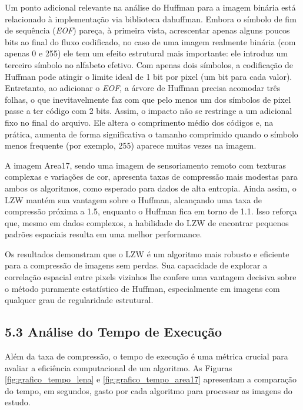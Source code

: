 \documentclass{report}
\begin{document}
Um ponto adicional relevante na análise do Huffman para a imagem binária está relacionado à implementação via biblioteca dahuffman. Embora o símbolo de fim de sequência (\textit{EOF}) pareça, à primeira vista, acrescentar apenas alguns poucos bits ao final do fluxo codificado, no caso de uma imagem realmente binária (com apenas 0 e 255) ele tem um efeito estrutural mais importante: ele introduz um terceiro símbolo no alfabeto efetivo. Com apenas dois símbolos, a codificação de Huffman pode atingir o limite ideal de 1 bit por pixel (um bit para cada valor). Entretanto, ao adicionar o \textit{EOF}, a árvore de Huffman precisa acomodar três folhas, o que inevitavelmente faz com que pelo menos um dos símbolos de pixel passe a ter código com 2 bits. Assim, o impacto não se restringe a um adicional fixo no final do arquivo. Ele altera o comprimento médio dos códigos e, na prática, aumenta de forma significativa o tamanho comprimido quando o símbolo menos frequente (por exemplo, 255) aparece muitas vezes na imagem.

A imagem Area17, sendo uma imagem de sensoriamento remoto com texturas complexas e variações de cor, apresenta taxas de compressão mais modestas para ambos os algoritmos, como esperado para dados de alta entropia. Ainda assim, o LZW mantém sua vantagem sobre o Huffman, alcançando uma taxa de compressão próxima a 1.5, enquanto o Huffman fica em torno de 1.1. Isso reforça que, mesmo em dados complexos, a habilidade do LZW de encontrar pequenos padrões espaciais resulta em uma melhor performance.

Os resultados demonstram que o LZW é um algoritmo mais robusto e eficiente para a compressão de imagens sem perdas. Sua capacidade de explorar a correlação espacial entre pixels vizinhos lhe confere uma vantagem decisiva sobre o método puramente estatístico de Huffman, especialmente em imagens com qualquer grau de regularidade estrutural.

\subsection*{5.3 Análise do Tempo de Execução}
\label{sec:analise_tempo}

Além da taxa de compressão, o tempo de execução é uma métrica crucial para avaliar a eficiência computacional de um algoritmo. As Figuras \ref{fig:grafico_tempo_lena} e \ref{fig:grafico_tempo_area17} apresentam a comparação do tempo, em segundos, gasto por cada algoritmo para processar as imagens do estudo.
\end{document}
